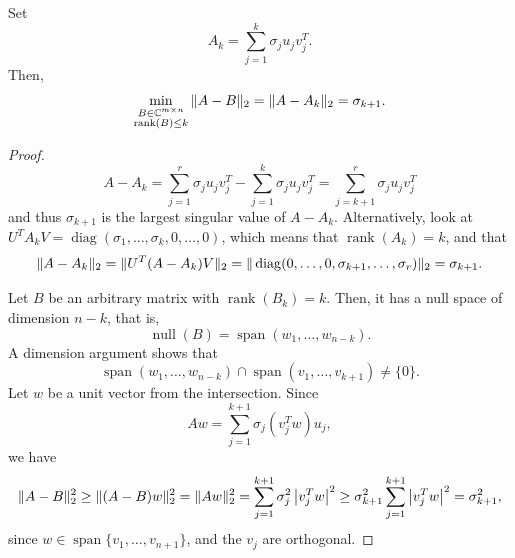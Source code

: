 \documentclass{article}
\begin{document}
\begin{theorem}
Set
\begin{equation*}
A_{k} = \sum_{j=1}^{k} \sigma_{j} u_{j} v_{j}^{T}.
\end{equation*}
Then,
\begin{equation*}
\min_{\substack{B \in \mathbb{C}^{m \times n} \\
\operatorname{rank}(B) \leq k}} \| A-B \|_{2} = \| A-A_{k} \|_{2}
= \sigma_{k+1}.
\end{equation*}
\end{theorem}
\begin{proof}
\begin{equation*}
A-A_{k} = \sum_{j=1}^{r} \sigma_{j} u_{j} v_{j}^{T} - \sum_{j=1}^{k}
\sigma_{j} u_{j} v_{j}^{T} = \sum_{j=k+1}^{r} \sigma_{j} u_{j}
v_{j}^{T}
\end{equation*}
and thus $\sigma_{k+1}$ is the largest singular value of $A-A_{k}$.
Alternatively, look at $U^{T} A_{k} V =
\operatorname{diag}(\sigma_{1},\ldots,\sigma_{k},0,\ldots,0)$, which
means that $\operatorname{rank}(A_{k}) = k$, and that
\begin{equation*}
\| A-A_{k} \|_{2} = \| U^{T} (A-A_{k}) V \|_{2} =
\| \operatorname{diag}(0,\ldots,0,\sigma_{k+1},\ldots,\sigma_{r}) \|_{2}
= \sigma_{k+1}.
\end{equation*}

Let $B$ be an arbitrary matrix with $\operatorname{rank}(B_{k}) =
k$. Then, it has a null space of dimension $n-k$, that is,
\begin{equation*}
\operatorname{null}(B) = \operatorname{span}(w_{1},\ldots,w_{n-k}).
\end{equation*}
A dimension argument shows that
\begin{equation*}
\operatorname{span}(w_{1},\ldots,w_{n-k}) \cap
\operatorname{span}(v_{1},\ldots,v_{k+1}) \ne \{ 0 \}.
\end{equation*}
Let $w$ be a unit vector from the intersection. Since
\begin{equation*}
Aw = \sum_{j=1}^{k+1} \sigma_{j} (v_{j}^{T}w) u_{j},
\end{equation*}
we have
\begin{equation*}
\| A-B \|_{2}^{2} \ge \| (A-B)w \|_{2}^{2} = \| Aw \|_{2}^{2} =
\sum_{j=1}^{k+1} \sigma_{j}^{2} \left| v_{j}^{T}w \right|^{2} \ge
\sigma_{k+1}^{2} \sum_{j=1}^{k+1} \left| v_{j}^{T}w \right|^{2} =
\sigma_{k+1}^{2},
\end{equation*}
since $w \in \operatorname{span}\{v_{1},\ldots,v_{n+1}\}$, and the
$v_{j}$ are orthogonal.
\end{proof}
\end{document}
